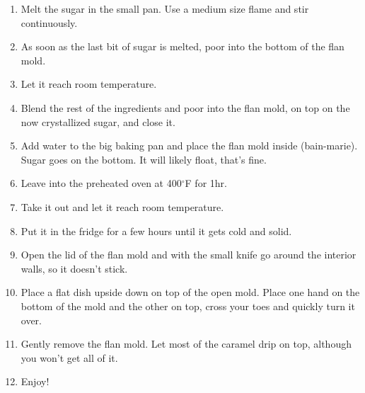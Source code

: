\begin{enumerate}
\item Melt the sugar in the small pan. Use a medium size flame and stir continuously.
\item As soon as the last bit of sugar is melted, poor into the bottom of the flan mold.  
\item Let it reach room temperature.
\item Blend the rest of the ingredients and poor into the flan mold, on top on the now crystallized sugar, and close it.
\item Add water to the big baking pan and place the flan mold inside (bain-marie). Sugar goes on the bottom. It will likely float, that's fine.
\item Leave into the preheated oven at 400${}^\circ$F for 1hr.
\item Take it out and let it reach room temperature.
\item Put it in the fridge for a few hours until it gets cold and solid.
\item Open the lid of the flan mold and with the small knife go around the interior walls, so it doesn't stick.
\item Place a flat dish upside down on top of the open mold. Place one hand on the bottom of the mold and the other on top, cross your toes and quickly turn it over.
\item Gently remove the flan mold. Let most of the caramel drip on top, although you won't get all of it.
\item Enjoy!
\end{enumerate}

